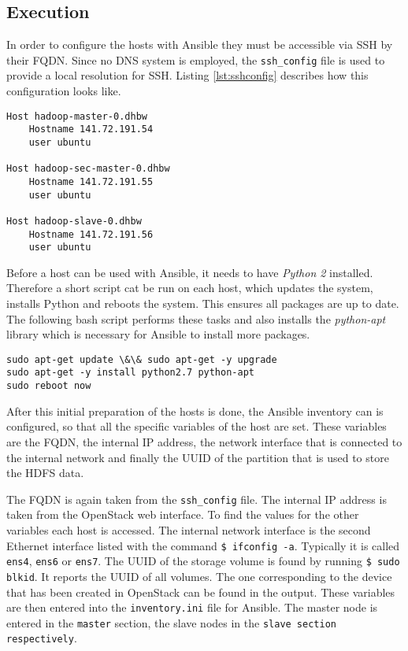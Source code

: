 \subsection{Execution}

In order to configure the hosts with Ansible they must be accessible via \ac{SSH} by their \ac{FQDN}. 
Since no \ac{DNS} system is employed, the \texttt{ssh\_config} file is used to provide a local resolution for \ac{SSH}. 
Listing \ref{lst:sshconfig} describes how this configuration looks like.

\lstset{language=sh}
\begin{lstlisting}[caption={Local SSH configuration file used by Ansible}, label={lst:sshconfig}]
Host hadoop-master-0.dhbw
    Hostname 141.72.191.54
    user ubuntu

Host hadoop-sec-master-0.dhbw
    Hostname 141.72.191.55
    user ubuntu

Host hadoop-slave-0.dhbw
    Hostname 141.72.191.56
    user ubuntu
\end{lstlisting}

Before a host can be used with Ansible, it needs to have \emph{Python 2} installed.
Therefore a short script cat be run on each host, which updates the system, installs Python and reboots the system. This ensures all packages are up to date. The following bash script performs these tasks and also installs the \emph{python-apt} library which is necessary for Ansible to install more packages.

\lstset{language=sh}
\begin{lstlisting}[caption={Bash script for initial host preparation}, label={lst:hostsetup}]
sudo apt-get update \&\& sudo apt-get -y upgrade
sudo apt-get -y install python2.7 python-apt
sudo reboot now
\end{lstlisting}

After this initial preparation of the hosts is done, 
the Ansible inventory can is configured, 
so that all the specific variables of the host are set. 
These variables are the \ac{FQDN}, the internal \ac{IP} address, 
the network interface that is connected to the internal network 
and finally the \ac{UUID} of the partition that is used to store the \ac{HDFS} data.

The \ac{FQDN} is again taken from the \texttt{ssh\_config} file. 
The internal \ac{IP} address is taken from the OpenStack web interface.
To find the values for the other variables each host is accessed.
The internal network interface is the second Ethernet interface listed with the command \texttt{\$ ifconfig -a}. Typically it is called \texttt{ens4}, \texttt{ens6} or \texttt{ens7}.
The \ac{UUID} of the storage volume is found by running \texttt{\$ sudo blkid}. 
It reports the \ac{UUID} of all volumes. The one corresponding to the device that has been created in OpenStack can be found in the output. These variables are then entered into the \texttt{inventory.ini} file for Ansible. The master node is entered in the \texttt{master} section, the slave nodes in the \texttt{slave section respectively}.

